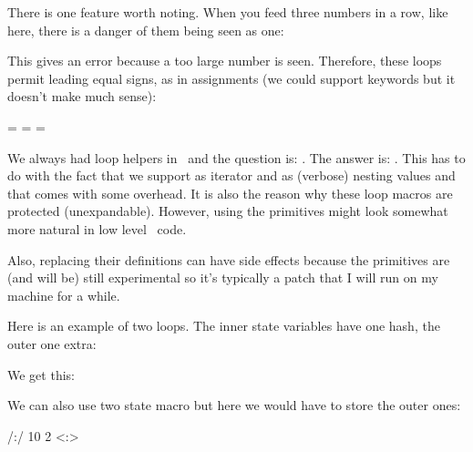 \blank \start \veryraggedright \tt\tfx \getbuffer \stop \blank

There is one feature worth noting. When you feed three numbers in a row, like here,
there is a danger of them being seen as one:

\starttyping
\expandedloop
  \number{}
  \number{}
  \number{}
  {}
\stoptyping

This gives an error because a too large number is seen. Therefore, these loops
permit leading equal signs, as in assignments (we could support keywords but
it doesn't make much sense):

\starttyping
\expandedloop =\number{} =\number{} =\number{}
\stoptyping

\stopsectionlevel

\startsectionlevel[title=Wrappers]

We always had loop helpers in \CONTEXT\ and the question is: . The answer
is: . This
has to do with the fact that we support  as iterator and  as
(verbose) nesting values and that comes with some overhead. It is also the reason
why these loop macros are protected (unexpandable). However, using the primitives
might look somewhat more natural in low level \TEX\ code.

Also, replacing their definitions can have side effects because the primitives are
(and will be) still experimental so it's typically a patch that I will run on my
machine for a while.

Here is an example of two loops. The inner state variables have one hash, the outer
one extra:

\startbuffer
{}
\stopbuffer

\typebuffer[option=TEX]

We get this:

\startpacked \getbuffer \stoppacked

We can also use two state macro but here we would have to store the outer ones:

\startbuffer
{} {
    /\recursedepth:\recurselevel/
     {10} {2} {
        <\recursedepth:\recurselevel>
    }\par
}
\stopbuffer

